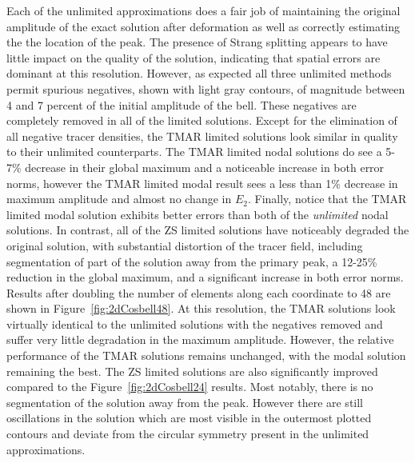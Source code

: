 \documentclass{ametsoc}
\begin{document}
Each of the unlimited approximations does a fair job of maintaining the original amplitude of the exact solution after deformation as well as correctly estimating the the location of the peak. The presence of Strang splitting appears to have little impact on the quality of the solution, indicating that spatial errors are dominant at this resolution. However, as expected all three unlimited methods permit spurious negatives, shown with light gray contours, of magnitude between 4 and 7 percent of the initial amplitude of the bell. These negatives are completely removed in all of the limited solutions. Except for the elimination of all negative tracer densities, the TMAR limited solutions look similar in quality to their unlimited counterparts. The TMAR limited nodal solutions do see a 5-7\% decrease in their global maximum and a noticeable increase in both error norms, however the TMAR limited modal result sees a less than 1\% decrease in maximum amplitude and almost no change in $E_2$. Finally, notice that the TMAR limited modal solution exhibits better errors than both of the {\it unlimited} nodal solutions. In contrast, all of the ZS limited solutions have noticeably degraded the original solution, with substantial distortion of the tracer field, including segmentation of part of the solution away from the primary peak, a 12-25\% reduction in the global maximum, and a significant increase in both error norms. Results after doubling the number of elements along each coordinate to 48 are shown in Figure~\ref{fig:2dCosbell48}. At this resolution, the TMAR solutions look virtually identical to the unlimited solutions with the negatives removed and suffer very little degradation in the maximum amplitude. However, the relative performance of the TMAR solutions remains unchanged, with the modal solution remaining the best. The ZS limited solutions are also significantly improved compared to the Figure~\ref{fig:2dCosbell24} results. Most notably, there is no segmentation of the solution away from the peak. However there are still oscillations in the solution which are most visible in the outermost plotted contours and deviate from the circular symmetry present in the unlimited approximations.
\end{document}
